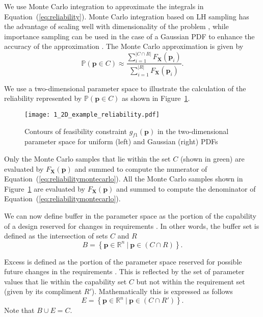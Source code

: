 We use Monte Carlo integration to approximate the integrals in Equation~(\ref{eq:reliability}). Monte Carlo integration based on \acf{LH} sampling has the advantage of scaling well with dimensionality of the problem \cite{Magnusen1997,Zhang2016}, while importance sampling can be used in the case of a Gaussian \ac{PDF} to enhance the accuracy of the approximation \cite{Frangopol2003a,ForouzandehShahraki2014,Kleiber2004}. The Monte Carlo approximation is given by
%
\begin{equation} \label{eq:reliabilitymontecarlo}
	\mathbb{P}(\mathbf{p} \in C) \approx \dfrac{\sum\limits_{i=1}^{|{C\cap R}|} F_{\mathbf{X}}(\mathbf{p}_i)}{\sum\limits_{i=1}^{|R|} F_{\mathbf{X}}(\mathbf{p}_i)}.
\end{equation}

We use a two-dimensional parameter space to illustrate the calculation of the reliability represented by  $\mathbb{P}(\mathbf{p} \in C)$ as shown in Figure~\ref{fig:2Dexamplereliability}.
%
\begin{figure}[h]
	\centering
	\texttt{[image: 1\_2D\_example\_reliability.pdf]}
	\caption{Contours of feasibility constraint $g_{f1}(\mathbf{p})$ in the two-dimensional parameter space for uniform (left) and Gaussian (right) \acp{PDF}}
	\label{fig:2Dexamplereliability}
\end{figure}
%
Only the Monte Carlo samples that lie within the set $C$ (shown in green) are evaluated by $F_{\mathbf{X}}(\mathbf{p})$ and summed to compute the numerator of Equation~(\ref{eq:reliabilitymontecarlo}). All the Monte Carlo samples shown in Figure~\ref{fig:2Dexamplereliability} are evaluated by $F_{\mathbf{X}}(\mathbf{p})$ and summed to compute the denominator of Equation~(\ref{eq:reliabilitymontecarlo}). %

We can now define buffer in the parameter space as the portion of the capability of a design reserved for changes in requirements \cite{Eckert2019}. In other words, the buffer set is defined as the intersection of sets $C$ and $R$
%
\begin{equation} \label{eq:buffer}
	\textit{B} = \left\{\mathbf{p} \in \mathbb{R}^n~|~\mathbf{p} \in \left(C\cap R\right) \right\}.
\end{equation}

Excess is defined as the portion of the parameter space reserved for possible future changes in the requirements \cite{Eckert2019}. This is reflected by the set of parameter values that lie within the capability set $C$ but not within the requirement set (given by its compliment $R'$). Mathematically this is expressed as follows
% 
\begin{equation} \label{eq:excess}
	\textit{E} = \left\{\mathbf{p} \in \mathbb{R}^n~|~\mathbf{p} \in \left(C\cap R'\right) \right\}.
\end{equation}
%
Note that  $B\cup E = C$.


